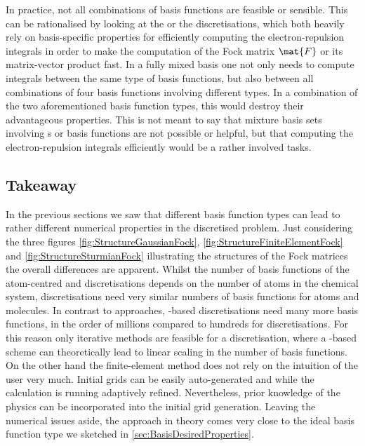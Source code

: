 In practice, not all combinations of basis functions are feasible or sensible.
This can be rationalised by looking at the {\cGTO} or the \CS discretisations,
which both heavily rely on basis-specific properties for efficiently
computing the electron-repulsion integrals
in order to make the computation of the Fock matrix $\mat{F}$
or its matrix-vector product fast.
In a fully mixed basis one not only needs to compute \ERI integrals
between the same type of basis functions,
but also between all combinations of four basis functions involving different types.
In a combination of the two aforementioned basis function types,
this would destroy their advantageous properties.
This is not meant to say that mixture basis sets involving
{\cGTO}s or {\CS} basis functions are not possible or helpful,
but that computing the electron-repulsion integrals efficiently
would be a rather involved tasks.

\subsection{Takeaway}
\label{sec:BasisTakeaway}
In the previous sections we saw that different basis function types
can lead to rather different numerical properties in the discretised \HF problem.
Just considering the three figures
\vref{fig:StructureGaussianFock},
\vref{fig:StructureFiniteElementFock}
and \vref{fig:StructureSturmianFock}
illustrating the structures of the Fock matrices
the overall differences are apparent.
Whilst the number of basis functions of the atom-centred
\cGTO and \CS discretisations depends on the number of atoms
in the chemical system,
\FE discretisations need very similar numbers of basis functions
for atoms and molecules.
In contrast to \AO approaches, \FE-based discretisations
need many more basis functions, in the order of millions
compared to hundreds for \AO discretisations.
For this reason only iterative methods
are feasible for a \FE discretisation,
where a \contraction-based scheme can theoretically
lead to linear scaling in the number of basis functions.
On the other hand the finite-element method
does not rely on the intuition of the user very much.
Initial grids can be easily auto-generated and
while the calculation is running adaptively refined.
Nevertheless, prior knowledge of the physics can be incorporated
into the initial grid generation.
Leaving the numerical issues aside,
the \FE approach in theory comes very close to the ideal
basis function type we sketched in \vref{sec:BasisDesiredProperties}.

